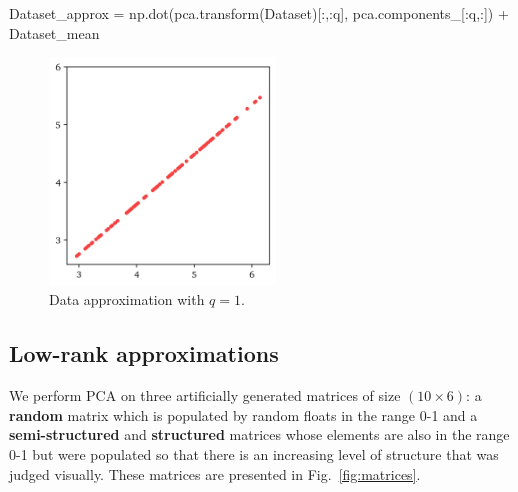 \documentclass[10pt,twocolumn]{article}
\begin{document}
\begin{python}
Dataset_approx = 
np.dot(pca.transform(Dataset)[:,:q], 
pca.components_[:q,:]) + Dataset_mean
\end{python}

\begin{figure}[H]
\centering\includegraphics[width=6cm]{python-data-approximation.png}
\caption{Data approximation with $q = 1$.}
\label{fig:python-data-approximation}
\end{figure}

\subsection{Low-rank approximations}

We perform PCA on three artificially generated matrices of size $(10 \times 6)$: a \textbf{random} matrix which is populated by random floats in the range 0-1 and a \textbf{semi-structured} and \textbf{structured} matrices whose elements are also in the range 0-1 but were populated so that there is an increasing level of structure that was judged visually. These matrices are presented in Fig.~\ref{fig:matrices}.
\end{document}
